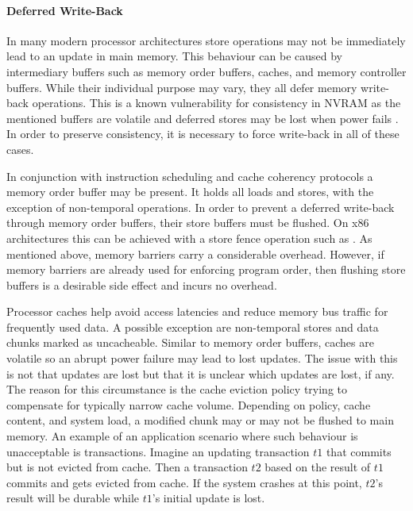 \paragraph{Deferred Write-Back}

In many modern processor architectures store operations may not  be immediately
lead to an update in main memory. This behaviour can be caused by intermediary
buffers such as memory order buffers, caches, and memory controller buffers.
While their individual purpose may vary, they all defer memory write-back
operations. This is a known vulnerability for consistency in NVRAM as the
mentioned buffers are volatile and deferred stores may be lost when power fails
\cite{condit2009better, oukid2017data}. In order to preserve consistency, it is
necessary to force write-back in all of these cases.


In conjunction with instruction scheduling and cache coherency protocols a
memory order buffer may be present. It holds all loads and stores, with the
exception of non-temporal operations. In order to prevent a deferred write-back
through memory order buffers, their store buffers must be flushed. On x86
architectures this can be achieved with a store fence operation such as
. As mentioned above, memory barriers carry a considerable
overhead. However, if memory barriers are already used for enforcing program
order, then flushing store buffers is a desirable side effect and incurs no
overhead.


Processor caches help avoid access latencies and reduce memory bus traffic for
frequently used data. A possible exception are non-temporal stores and data
chunks marked as uncacheable. Similar to memory order buffers, caches are
volatile so an abrupt power failure may lead to lost updates. The issue with
this is not that updates are lost but that it is unclear which updates are lost,
if any. The reason for this circumstance is the cache eviction policy trying to
compensate for typically narrow cache volume. Depending on policy, cache
content, and system load, a modified chunk may or may not be flushed to main
memory. An example of an application scenario where such behaviour is
unacceptable is transactions. Imagine an updating transaction $t1$ that commits
but is not evicted from cache. Then a transaction $t2$ based on the result of
$t1$ commits and gets evicted from cache. If the system crashes at this point,
$t2$'s result will be durable while $t1$'s initial update is lost.

